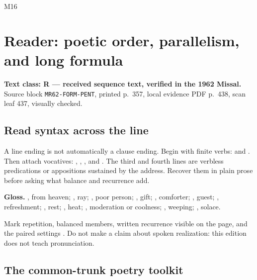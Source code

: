 
\begin{courseunit}{M16}
\chapter{Reader: poetic order, parallelism, and long formula}

\textbf{Text class: R --- received sequence text, verified in the 1962
Missal.}  Source block \texttt{MR62-FORM-PENT}, printed p.~357, local evidence
PDF p.~438, scan leaf 437, visually checked.

\begin{quote}
\end{quote}

\section{Read syntax across the line}

A line ending is not automatically a clause ending.  Begin with finite verbs:
 and .  Then attach vocatives:
, , , and
.  The third and fourth lines are verbless predications
or appositions sustained by the address.  Recover them in plain prose before
asking what balance and recurrence add.

\textbf{Gloss.} , from heaven; , ray;
, poor person; , gift; , comforter;
, guest; , refreshment; , rest;
, heat; , moderation or coolness;
, weeping; , solace.

Mark repetition, balanced members, written recurrence visible on the page, and
the paired settings .  Do not make a claim
about spoken realization: this edition does not teach pronunciation.

\section{The common-trunk poetry toolkit}


\end{courseunit}
